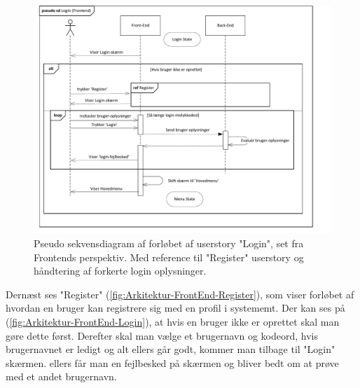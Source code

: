 \begin{figure}[h]
\centering
\includegraphics[width = \textwidth]{02-Body/Images/Front-End_-_Arkitektur-login.pdf}
\caption{Pseudo sekvensdiagram af forløbet af userstory "Login", set fra Frontends perspektiv. Med reference til "Register" userstory og håndtering af forkerte login oplysninger.}
\label{fig:Arkitektur-FrontEnd-Login}
\end{figure}

\noindent Dernæst ses "Register" (\autoref{fig:Arkitektur-FrontEnd-Register}), som viser forløbet af hvordan en bruger kan registrere sig med en profil i systememt. Der kan ses på (\autoref{fig:Arkitektur-FrontEnd-Login}), at hvis en bruger ikke er oprettet skal man gøre dette først. Derefter skal man vælge et brugernavn og kodeord, hvis brugernavnet er ledigt og alt ellers går godt, kommer man tilbage til "Login" skærmen. ellers får man en fejlbesked på skærmen og bliver bedt om at prøve med et andet brugernavn.\\

